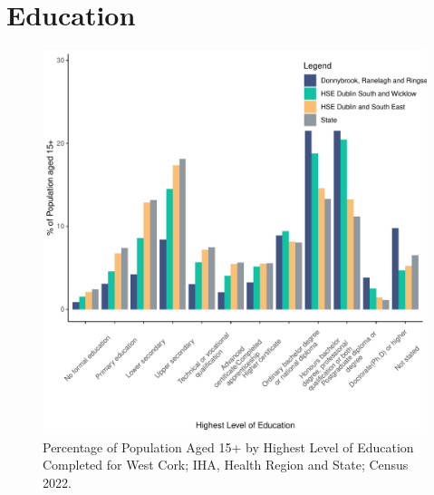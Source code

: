 \documentclass{article}
\begin{document}
\section{Education}\label{sect:Edu}
\begin{figure}[H]
	\centering
	\includegraphics[width = 120mm]{../figures/EduED.pdf}
	\caption{Percentage of Population Aged 15+ by Highest Level of Education Completed for West Cork; IHA, Health Region and State; Census 2022.}
	\label{fig:vbnv}
	\end{figure}
\end{document}
